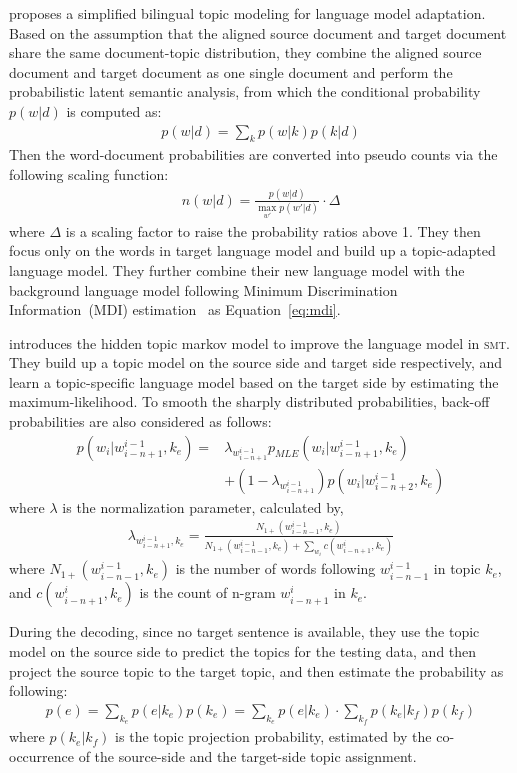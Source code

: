 \cite{Ruiz-2011} proposes a simplified bilingual topic modeling for language model adaptation. Based on the assumption that the aligned source document and target document share the same document-topic distribution, they combine the aligned source document and target document as one single document and perform the probabilistic latent semantic analysis, from which the conditional probability $p(w|d)$ is computed as:
\begin{align}
p(w|d) = \sum_k p(w|k) p(k|d)
\end{align}
Then the word-document probabilities are converted into pseudo counts via the following scaling function:
\begin{align}
n(w|d) = \frac{p(w|d)}{\max_{w'} p(w'|d)} \cdot \Delta
\end{align}
where $\Delta$ is a scaling factor to raise the probability ratios above 1. They then focus only on the words in target language model and build up a topic-adapted language model. They further combine their new language model with the background language model following Minimum Discrimination Information~(\textsc{MDI}) estimation~\cite{Kneser-1997b} as Equation~\ref{eq:mdi}. 

\citet{Yu-2013} introduces the hidden topic markov model to improve the language model in \textsc{smt}. They build up a topic model on the source side and target side respectively, and learn a topic-specific language model based on the target side by estimating the maximum-likelihood. To smooth the sharply distributed probabilities, back-off probabilities are also considered as follows:
\begin{align}
p(w_i | w^{i-1}_{i-n+1}, k_e) = &\lambda_{w^{i-1}_{i-n+1}} p_{MLE}(w_i|w^{i-1}_{i-n+1}, k_e) \\
&+ (1- \lambda_{w^{i-1}_{i-n+1}})p(w_i|w^{i-1}_{i-n+2}, k_e)
\end{align}
where $\lambda$ is the normalization parameter, calculated by,
\begin{align}
\lambda_{w^{i-1}_{i-n+1}, k_e} = \frac{N_{1+}(w^{i-1}_{i-n-1}, k_e)}{N_{1+}(w^{i-1}_{i-n-1}, k_e) + \sum_{w_i}c(w^i_{i-n+1}, k_e)}
\end{align}
where $N_{1+}(w^{i-1}_{i-n-1}, k_e)$ is the number of words following $w^{i-1}_{i-n-1}$ in topic $k_e$, and $c(w^i_{i-n+1}, k_e)$ is the count of n-gram $w^i_{i-n+1}$ in $k_e$.

During the decoding, since no target sentence is available, they use the topic model on the source side to predict the topics for the testing data, and then project the source topic to the target topic, and then estimate the probability as following:
\begin{align}
p(e) = \sum_{k_e} p(e|k_e) p(k_e) = \sum_{k_e} p(e|k_e) \cdot \sum_{k_f} p(k_e|k_f) p (k_f)
\end{align}
where $p(k_e|k_f)$ is the topic projection probability, estimated by the co-occurrence of the source-side and the target-side topic assignment.


